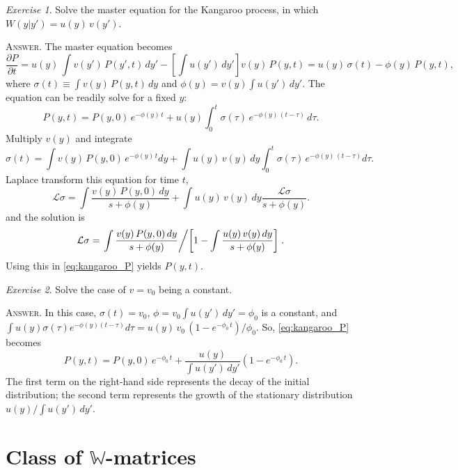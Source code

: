 \documentclass{book}
\numberwithin{equation}{section}
\theoremstyle{plain}
\theoremstyle{definition}
\theoremstyle{remark}
\theoremstyle{BoldStyle}
\newtheorem{exercise}{Exercise}
\numberwithin{exercise}{section}
\newcommand{\answer}[1]{{\color{DarkBlue}\footnotesize \textsc{Answer.} #1}}
\begin{document}
\begin{exercise}
  Solve the master equation for the Kangaroo process,
  in which $W(y|y') = u(y) \, v(y')$.

  \answer{
  The master equation becomes
  $$
  \frac{ \partial P } { \partial t }
  =
  u(y) \, \int v(y') \, P(y', t) \, dy'
  -
  \left[\int u(y') \, dy' \right]
  v(y) \, P(y, t)
  =
  u(y) \, \sigma(t) - \phi(y) \, P(y, t),
  $$
  where $\sigma(t) \equiv \int v(y) \, P(y, t) \, dy$
  and
  $\phi(y) = v(y) \int u(y') \, dy'$.
  The equation can be readily solve for a fixed $y$:
  \begin{equation}
  P(y, t)
  =
  P(y, 0) \, e^{-\phi(y) \, t}
  +
  u(y) \int_0^t \sigma(\tau) \, e^{-\phi(y) \, (t - \tau)} \, d\tau.
  \label{eq:kangaroo_P}
  \end{equation}
  Multiply $v(y)$ and integrate
  $$
  \sigma(t) = \int v(y) \, P(y, 0) \, e^{-\phi(y) \, t} dy
  +
  \int u(y) \, v(y) \, dy
  \int_0^t \sigma(\tau) \, e^{-\phi(y) \, (t - \tau) } d\tau.
  $$
  Laplace transform this equation for time $t$,
  $$
  \mathcal L\sigma
  =
  \int \frac{ v(y) \, P(y, 0) \, dy } { s + \phi(y) }
  +
  \int u(y) \, v(y) \, dy \frac{ \mathcal L\sigma }{ s + \phi(y) }.
  $$
  and the solution is
  $$
  \mathcal L\sigma
  =
  \left. \int \frac{ v(y) \, P(y, 0) \, dy } { s + \phi(y) }
  \middle/
  \left[
    1 - \int \frac{ u(y) \, v(y) \, dy }{ s + \phi(y) }
  \right]
  \right..
  $$
  Using this in \eqref{eq:kangaroo_P} yields $P(y, t)$.
  }
\end{exercise}

\begin{exercise}
  Solve the case of $v = v_0$ being a constant.

  \answer{
  In this case, $\sigma(t) = v_0$,
  $\phi = v_0 \int u(y') \, dy' = \phi_0$
  is a constant,
  and
  $
  \int u(y) \sigma(\tau) e^{-\phi(y) (t - \tau)} d\tau
  = u(y) \, v_0 \, (1 - e^{-\phi_0 \, t}) / \phi_0.
  $
  So, \eqref{eq:kangaroo_P} becomes
  $$
  P(y, t)
  =
  P(y, 0) \, e^{-\phi_0 \, t}
  +
  \frac{ u(y) } { \int u(y') \, dy' }
  \left(
    1 - e^{-\phi_0 \, t}
  \right).
  $$
  The first term on the right-hand side represents
  the decay of the initial distribution;
  the second term represents the growth of the stationary distribution
  $u(y) / \int u(y') \, dy'$.
  }
\end{exercise}


\section{Class of $\mathbb W$-matrices}
\end{document}
